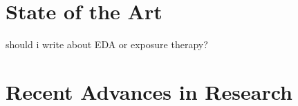 



\section{State of the Art}
should i write about EDA or exposure therapy?

\newpage

\section{Recent Advances in Research}

